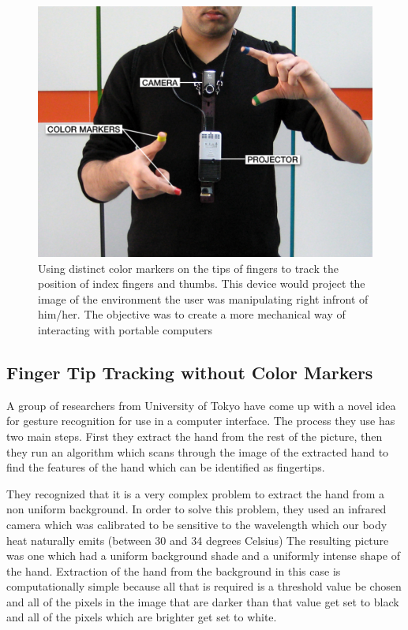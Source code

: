 \documentclass[a4paper,12pt]{report}
\begin{document}
\begin{figure}[H]
\centering
\includegraphics{sixthsense02.eps}
\caption{Using distinct color markers on the tips of fingers to track the position of index fingers and thumbs. This device would project the image of the environment the user was manipulating right infront of him/her. The objective was to create a more mechanical way of interacting with portable computers}
\end{figure}


\subsection{Finger Tip Tracking without Color Markers}

A group of researchers from University of Tokyo\cite{fingertip} have come up with a novel idea for gesture recognition for use in a computer interface. The process they use has two main steps. First they extract the hand from the rest of the picture, then they run an algorithm which scans through the image of the extracted hand to find the features of the hand which can be identified as fingertips. 

They recognized that it is a very complex problem to extract the hand from a non uniform background. In order to solve this problem, they used an infrared camera which was calibrated to be sensitive to the wavelength which our body heat naturally emits (between 30 and 34 degrees Celsius)  The resulting picture was one which had a uniform background shade and a uniformly intense shape of the hand. Extraction of the hand from the background in this case is computationally simple because all that is required is a threshold value be chosen and all of the pixels in the image that are darker than that value get set to black and all of the pixels which are brighter get set to white.  
\end{document}
